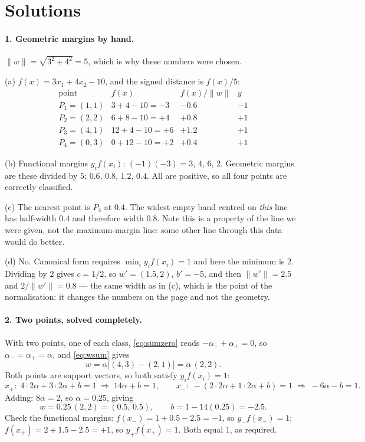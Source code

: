 \documentclass[11pt]{article}
\begin{document}
\section{Solutions}
\label{sec:solutions}

\paragraph{1. Geometric margins by hand.}
$\|w\| = \sqrt{3^2 + 4^2} = 5$, which is why these numbers were chosen.

(a) $f(x) = 3x_1 + 4x_2 - 10$, and the signed distance is $f(x)/5$:
\[
  \begin{array}{lrrr}
    \text{point} & f(x) & f(x)/\|w\| & y \\
    P_1 = (1,1) & 3 + 4 - 10 = -3 & -0.6 & -1\\
    P_2 = (2,2) & 6 + 8 - 10 = +4 & +0.8 & +1\\
    P_3 = (4,1) & 12 + 4 - 10 = +6 & +1.2 & +1\\
    P_4 = (0,3) & 0 + 12 - 10 = +2 & +0.4 & +1
  \end{array}
\]

(b) Functional margins $y_i f(x_i)$: $(-1)(-3) = 3$, $4$, $6$, $2$. Geometric
margins are these divided by $5$: $0.6$, $0.8$, $1.2$, $\mathbf{0.4}$. All are
positive, so all four points are correctly classified.

(c) The nearest point is $P_4$ at $0.4$. The widest empty band centred on
\emph{this} line has half-width $0.4$ and therefore width $\mathbf{0.8}$. Note
this is a property of the line we were given, not the maximum-margin line: some
other line through this data would do better.

(d) No. Canonical form requires $\min_i y_i f(x_i) = 1$ and here the minimum
is $2$. Dividing by $2$ gives $c = 1/2$, so $w' = (1.5, 2)$, $b' = -5$, and
then $\|w'\| = 2.5$ and $2/\|w'\| = 0.8$ --- the same width as in (c), which is
the point of the normalisation: it changes the numbers on the page and not the
geometry.

\paragraph{2. Two points, solved completely.}
With two points, one of each class, \eqref{eq:sumzero} reads
$-\alpha_- + \alpha_+ = 0$, so $\alpha_- = \alpha_+ = \alpha$, and
\eqref{eq:wsum} gives
\[
  w = \alpha\bigl[(4,3) - (2,1)\bigr] = \alpha\,(2,2) .
\]
Both points are support vectors, so both satisfy $y_i f(x_i) = 1$:
\[
  \text{$x_+$:}\ \ 4\cdot 2\alpha + 3\cdot 2\alpha + b = 1
  \;\Rightarrow\; 14\alpha + b = 1 ,
  \qquad
  \text{$x_-$:}\ \ -(2\cdot 2\alpha + 1\cdot 2\alpha + b) = 1
  \;\Rightarrow\; -6\alpha - b = 1 .
\]
Adding: $8\alpha = 2$, so $\alpha = 0.25$, giving
\[
  w = 0.25\,(2,2) = \mathbf{(0.5,\, 0.5)},
  \qquad
  b = 1 - 14(0.25) = \mathbf{-2.5} .
\]
Check the functional margins: $f(x_-) = 1 + 0.5 - 2.5 = -1$, so
$y_- f(x_-) = 1$; $f(x_+) = 2 + 1.5 - 2.5 = +1$, so $y_+ f(x_+) = 1$. Both
equal $1$, as required.
\end{document}
